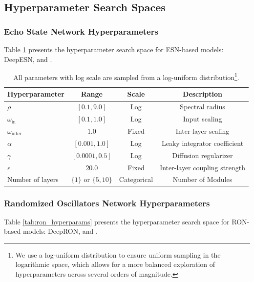\subsection{Hyperparameter Search Spaces}

\subsubsection{Echo State Network Hyperparameters}

Table \ref{tab:esn_hyperparams} presents the hyperparameter search space for ESN-based models: DeepESN, \DCR\@ and \DAR.

\begin{table}[ht!]
\centering
\caption{All parameters with log scale are sampled from a log-uniform distribution\footnote{We use a log-uniform distribution to ensure uniform sampling in the logarithmic space, which allows for a more balanced exploration of hyperparameters across several orders of magnitude.}.}
\label{tab:esn_hyperparams}
\begin{tabular}{@{}lccc@{}}
\toprule
\textbf{Hyperparameter} & \textbf{Range} & \textbf{Scale} & \textbf{Description} \\
\midrule
$\rho$ & $[0.1, 9.0]$ & Log &  Spectral radius \\
$\omega_{\text{in}}$ & $[0.1, 1.0]$ & Log &  Input scaling \\
$\omega_{\text{inter}}$ & $1.0$ & Fixed & Inter-layer scaling \\
$\alpha$ & $[0.001, 1.0]$ & Log & Leaky integrator coefficient \\
$\gamma$ & $[0.0001, 0.5]$ & Log & Diffusion regularizer \\
$\epsilon$ & $20.0$ & Fixed & Inter-layer coupling strength \\
Number of layers & $\{1\}$ or $\{5, 10\}$ & Categorical & Number of Modules \\
\bottomrule
\end{tabular}
\end{table}

\subsubsection{Randomized Oscillators Network Hyperparameters}

Table \ref{tab:ron_hyperparams} presents the hyperparameter search space for RON-based models: DeepRON, \DCO and \DAO.

